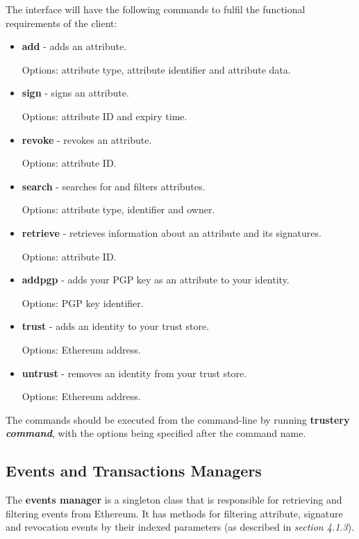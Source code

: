 \documentclass[12pt,a4paper]{report}
\begin{document}
	The interface will have the following commands to fulfil the functional requirements of the client:
	\begin{itemize}
		\item \textbf{add} - adds an attribute.
		
		Options: attribute type, attribute identifier and attribute data.
		\item \textbf{sign} - signs an attribute.
		
		Options: attribute ID and expiry time.
		\item \textbf{revoke} - revokes an attribute.
		
		Options: attribute ID.
		
		\item \textbf{search} - searches for and filters attributes.
		
		Options: attribute type, identifier and owner.
		
		\item \textbf{retrieve} - retrieves information about an attribute and its signatures.
		
		Options: attribute ID.
		
		\item \textbf{addpgp} - adds your PGP key as an attribute to your identity.
		
		Options: PGP key identifier.
		
		\item \textbf{trust} - adds an identity to your trust store.
		
		Options: Ethereum address.
		
		\item \textbf{untrust} - removes an identity from your trust store.
		
		Options: Ethereum address.
	\end{itemize}
	
	The commands should be executed from the command-line by running \textbf{trustery \textit{command}}, with the options being specified after the command name.
	
	\subsection{Events and Transactions Managers}
	The \textbf{events manager} is a singleton class that is responsible for retrieving and filtering events from Ethereum. It has methods for filtering attribute, signature and revocation events by their indexed parameters (as described in \textit{section 4.1.3}).
	
\end{document}
